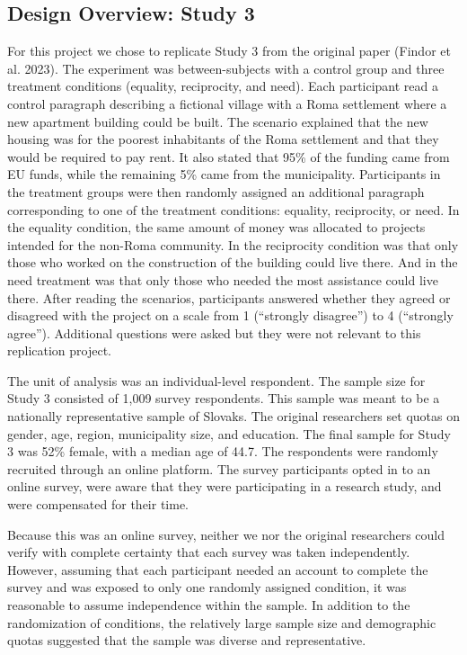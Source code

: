 \documentclass[titlepage]{article}
\begin{document}
\subsection{Design Overview: Study 3}
For this project we chose to replicate Study 3 from the original paper (Findor et al. 2023). The experiment was between-subjects with a control group and three treatment conditions (equality, reciprocity, and need). Each participant read a control paragraph describing a fictional village with a Roma settlement where a new apartment building could be built. The scenario explained that the new housing was for the poorest inhabitants of the Roma settlement and that they would be required to pay rent. It also stated that 95\% of the funding came from EU funds, while the remaining 5\% came from the municipality. Participants in the treatment groups were then randomly assigned an additional paragraph corresponding to one of the treatment conditions: equality, reciprocity, or need. In the equality condition, the same amount of money was allocated to projects intended for the non-Roma community. In the reciprocity condition was that only those who worked on the construction of the building could live there. And in the need treatment was that only those who needed the most assistance could live there. After reading the scenarios, participants answered whether they agreed or disagreed with the project on a scale from 1 (“strongly disagree”) to 4 (“strongly agree”). Additional questions were asked but they were not relevant to this replication project.

\justify
The unit of analysis was an individual-level respondent. The sample size for Study 3 consisted of 1,009 survey respondents. This sample was meant to be a nationally representative sample of Slovaks. The original researchers set quotas on gender, age, region, municipality size, and education. The final sample for Study 3 was 52\% female, with a median age of 44.7. The respondents were randomly recruited through an online platform. The survey participants opted in to an online survey, were aware that they were participating in a research study, and were compensated for their time.

\justify
Because this was an online survey, neither we nor the original researchers could verify with complete certainty that each survey was taken independently. However, assuming that each participant needed an account to complete the survey and was exposed to only one randomly assigned condition, it was reasonable to assume independence within the sample. In addition to the randomization of conditions, the relatively large sample size and demographic quotas suggested that the sample was diverse and representative.
\end{document}
